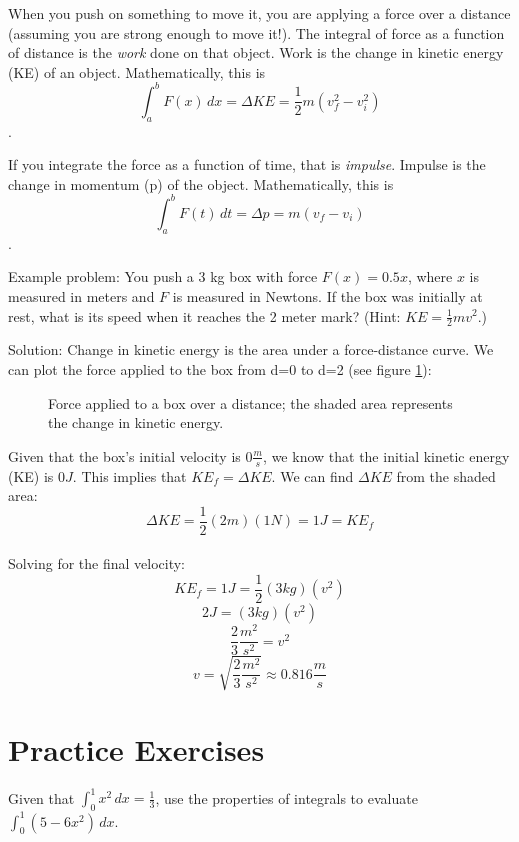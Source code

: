 When you push on something to move it, you are applying a force over 
a distance (assuming you are strong enough to move it!). The integral 
of force as a function of distance is the \textit{work} done on that 
object.  Work is the change in kinetic energy (KE) of an object. 
Mathematically, this is $$\int_{a}^{b} F(x)\,dx = \Delta KE = 
\frac{1}{2} m (v_f^2 - v_i^2)$$.

If you integrate the force as a function of time, that is 
\textit{impulse}. Impulse is the change in momentum (p) of the 
object. Mathematically, this is $$\int_{a}^{b} F(t)\,dt = \Delta p 
= m (v_f - v_i)$$.

Example problem: You push a 3 kg box with force $F(x) = 0.5x$, where 
$x$ is measured in meters and $F$ is measured in Newtons. If the box 
was initially at rest, what is its speed when it reaches the 2 meter 
mark? (Hint: $KE = \frac{1}{2} m v^2$.) 

Solution: Change in kinetic energy is the area under a force-distance 
curve. We can plot the force applied to the box from d=0 to d=2 (see 
figure \ref{fig:KEbox}):

\begin{figure}[htbp]
 \caption{Force applied to a box over a distance; the shaded area 
 represents the change in kinetic energy.}
 \label{fig:KEbox}
\end{figure}

Given that the box's initial velocity is $0 \frac{m}{s}$, we know that 
the initial kinetic energy (KE) is $0J$. This implies that $KE_f = 
\Delta KE$. We can find $\Delta KE$ from the shaded area:\\
$$\Delta KE = \frac{1}{2} (2m) (1N) = 1 J = KE_f$$\\
Solving for the final velocity:\\
$$KE_f = 1 J = \frac{1}{2}(3kg)(v^2)$$
$$2 J = (3 kg) (v^2)$$
$$\frac{2}{3} \frac{m^2}{s^2} = v^2$$
$$v=\sqrt{\frac{2}{3} \frac{m^2}{s^2}} \approx 0.816 \frac{m}{s}$$

\section{Practice Exercises}
\begin{Exercise}[label=defint2]
Given that $\int_{0}^{1} x^2\,dx = \frac{1}{3}$, use the properties 
of integrals to evaluate $\int_{0}^{1} (5-6x^2)\,dx$. 
\end{Exercise}


